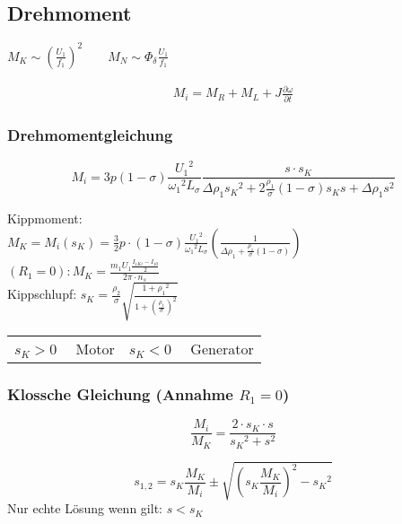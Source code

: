 \begin{sectionbox}
\subsection{Drehmoment}
\begin{emphbox}
$M_K\sim \left(\frac{U_1}{f_1}\right)^2\qquad M_N\sim\Phi_\delta\frac{U_1}{f_1}$
\end{emphbox}
\begin{align*}
M_i = M_R + M_L + J\frac{\partial\omega}{\partial t}
\end{align*}
\subsubsection{Drehmomentgleichung}
\begin{emphbox}
\[M_i = 3p(1-\sigma)\frac{{U_1}^2}{{\omega_1}^2 L_\sigma}\frac{s \cdot s_K}{\Delta\rho_1{s_K}^2 + 2\frac{\rho_1}{\sigma}(1-\sigma)s_K s+\Delta\rho_1 s^2}\]
\end{emphbox}
Kippmoment:\\
$M_K = M_i(s_K) = \frac{3}{2} p\cdot (1-\sigma)\frac{{U_1}^2}{{\omega_1}^2 L_\sigma}\left( \frac{1}{\Delta\rho_1+\frac{\rho_1}{\sigma}(1-\sigma)}\right)$\\
$(R_1 = 0): M_K = \frac{m_1U_1\frac{I_{1Ki} - I_{10}}{2}}{2\pi\cdot n_s}$\\
Kippschlupf: $s_K = \frac{\rho_2}{\sigma}\sqrt{\frac{1+{\rho_1}^2}{1+\left(\frac{\rho_1}{\sigma}\right)^2}}$

\begin{symbolbox}
\begin{tabularx}{\columnwidth}{CC}
$s_K > 0\quad$ Motor & $s_K < 0\quad$ Generator
\end{tabularx}
\end{symbolbox}
\end{sectionbox}

\begin{sectionbox}
\subsubsection{Klossche Gleichung (Annahme $R_1 = 0$)}
\begin{emphbox}
\[\frac{M_i}{M_K} = \frac{2\cdot s_K\cdot s}{{s_K}^2 + s^2}\]
\end{emphbox}
\[s_{1,2} = s_K \frac{M_K}{M_i} \pm \sqrt{\left(s_K \frac{M_K}{M_i}\right)^2 - {s_K}^2}\]
Nur echte Lösung wenn gilt: \quad $s < s_K$
\end{sectionbox}
